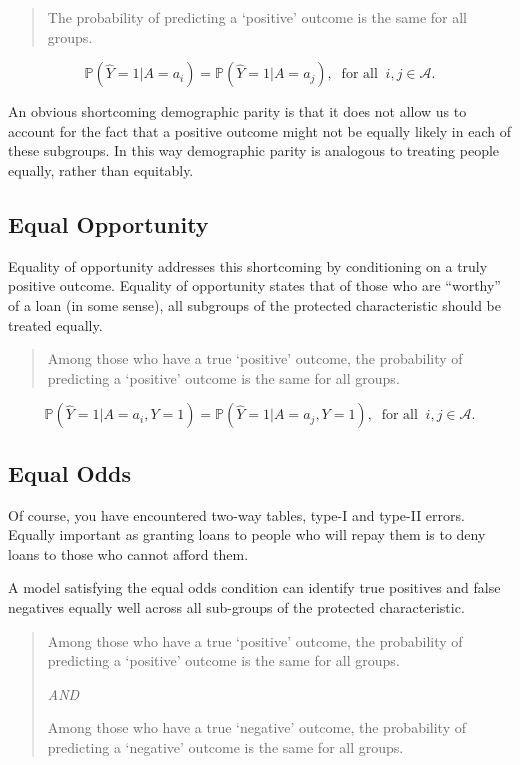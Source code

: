 \documentclass[
  12pt,
]{book}
\begin{document}
\begin{quote}
The probability of predicting a `positive' outcome is the same for all groups.
\end{quote}

\[\mathbb{P}(\hat Y = 1 | A = a_i) = \mathbb{P}( \hat Y = 1 | A = a_j), \  \text{ for all }\  i,j \in \mathcal{A}.\]

An obvious shortcoming demographic parity is that it does not allow us to account for the fact that a positive outcome might not be equally likely in each of these subgroups. In this way demographic parity is analogous to treating people equally, rather than equitably.

\hypertarget{equal-opportunity}{%
\subsection{Equal Opportunity}\label{equal-opportunity}}

Equality of opportunity addresses this shortcoming by conditioning on a truly positive outcome. Equality of opportunity states that of those who are ``worthy'' of a loan (in some sense), all subgroups of the protected characteristic should be treated equally.

\begin{quote}
Among those who have a true `positive' outcome, the probability of predicting a `positive' outcome is the same for all groups.
\end{quote}

\[\mathbb{P}(\hat Y = 1 | A = a_i, Y =1) = \mathbb{P}( \hat Y = 1 | A = a_j, Y=1), \  \text{ for all }\  i,j \in \mathcal{A}.\]

\hypertarget{equal-odds}{%
\subsection{Equal Odds}\label{equal-odds}}

Of course, you have encountered two-way tables, type-I and type-II errors. Equally important as granting loans to people who will repay them is to deny loans to those who cannot afford them.

A model satisfying the equal odds condition can identify true positives and false negatives equally well across all sub-groups of the protected characteristic.

\begin{quote}
Among those who have a true `positive' outcome, the probability of predicting a `positive' outcome is the same for all groups.

\emph{AND}

Among those who have a true `negative' outcome, the probability of predicting a `negative' outcome is the same for all groups.
\end{quote}
\end{document}
